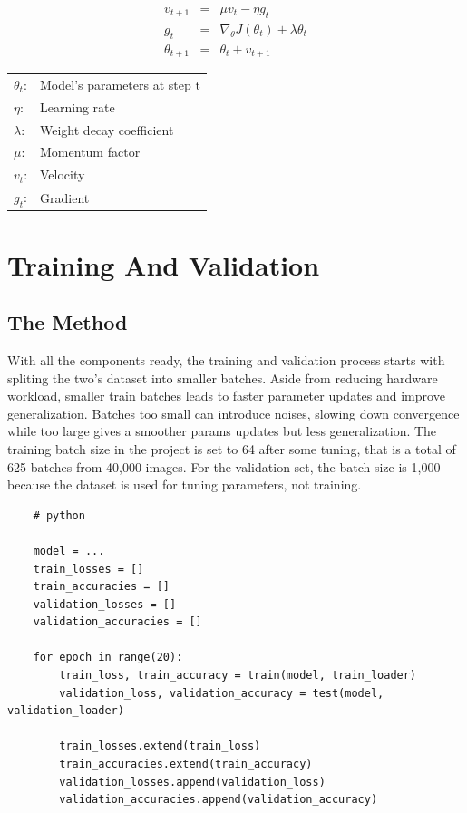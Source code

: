 \documentclass{report}
\begin{document}
\[
\begin{array}{rcl}
    v_{t+1}      & = & \mu v_t - \eta g_t                               \\ [0.2cm]
    g_t          & = & \nabla_{\theta} J(\theta_t) + \lambda \theta_t   \\ [0.2cm]
    \theta_{t+1} & = & \theta_t + v_{t+1}  
\end{array}
\]

\begin{center}
    \begin{tabular}{ll}
        $\theta_t$: & Model's parameters at step t      \\
        $\eta$:     & Learning rate                     \\
        $\lambda$:  & Weight decay coefficient          \\
        $\mu$:      & Momentum factor                   \\
        $v_t$:      & Velocity                          \\
        $g_t$:      & Gradient 
    \end{tabular}   
\end{center}

\section{Training And Validation}
\subsection{The Method}
With all the components ready, the training and validation process starts with spliting the two's dataset into 
smaller batches. Aside from reducing hardware workload, smaller train batches leads to faster parameter updates 
and improve generalization. Batches too small can introduce noises, slowing down convergence while too large 
gives a smoother params updates but less generalization. The training batch size in the project is set to 64 
after some tuning, that is a total of 625 batches from 40,000 images. For the validation set, the batch size is 
1,000 because the dataset is used for tuning parameters, not training.  

\begin{verbatim}
    # python

    model = ...
    train_losses = []
    train_accuracies = []
    validation_losses = []
    validation_accuracies = []

    for epoch in range(20):
        train_loss, train_accuracy = train(model, train_loader)
        validation_loss, validation_accuracy = test(model, validation_loader)

        train_losses.extend(train_loss)
        train_accuracies.extend(train_accuracy)
        validation_losses.append(validation_loss)
        validation_accuracies.append(validation_accuracy)
\end{verbatim}
\end{document}
